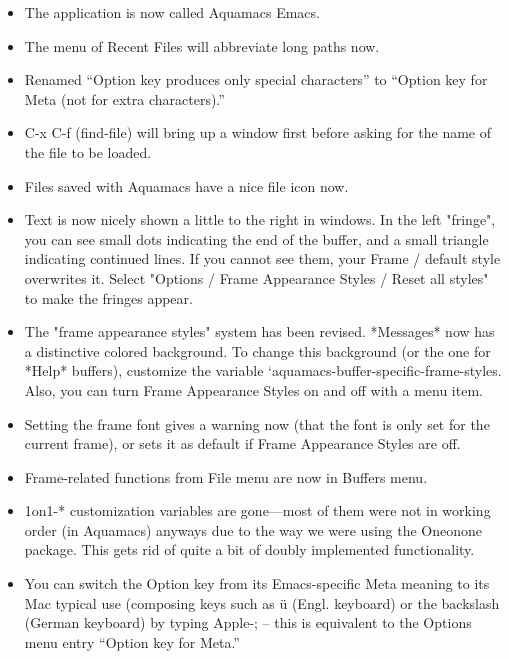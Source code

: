 \begin{itemize}
\item The application is now called Aquamacs Emacs.



\item The menu of Recent Files will abbreviate long paths now.


\item Renamed ``Option key produces only special characters'' to
  ``Option key for Meta (not for extra characters).''

\item C-x C-f  (find-file) will bring up a window first before asking for the
        name of the file to be loaded.

\item Files saved with Aquamacs have a nice file icon now.

\item Text is now nicely shown a little to the right in windows. In
        the left "fringe", you can see small dots indicating the end of
        the buffer, and a small triangle indicating continued lines. If
        you cannot see them, your Frame / default style overwrites
        it. Select "Options / Frame Appearance Styles / Reset all styles"
        to make the fringes appear.

\item The "frame appearance styles" system has been revised. *Messages* now has
        a distinctive colored background. To change this background (or
        the one for *Help* buffers), customize the variable
        `aquamacs-buffer-specific-frame-styles. Also, you can turn Frame Appearance Styles on and off with a menu
        item.

\item Setting the frame font gives a warning now (that the font
        is only set for the current frame), or sets it as default if Frame
        Appearance Styles are off.

\item Frame-related functions from File menu are now in Buffers menu.

\item 1on1-* customization variables are gone---most of them were not in working
        order (in Aquamacs) anyways due to the way we were using the
        Oneonone package. This gets rid of quite a bit of doubly
        implemented functionality.

\item You can switch the Option key from its Emacs-specific
        Meta meaning to its Mac typical use (composing keys such as \"{u}
         (Engl. keyboard) or the backslash (German keyboard) by typing Apple-; -- this
        is equivalent to the Options menu entry ``Option key for Meta.''


\end{itemize}
